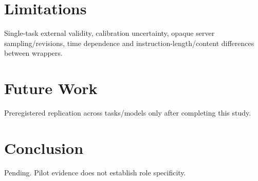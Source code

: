 \documentclass{article}
\begin{document}
\section{Limitations}
Single-task external validity, calibration uncertainty, opaque server sampling/revisions,
time dependence and instruction-length/content differences between wrappers.
\section{Future Work}
Preregistered replication across tasks/models only after completing this study.
\section{Conclusion}
Pending. Pilot evidence does not establish role specificity.


\end{document}
